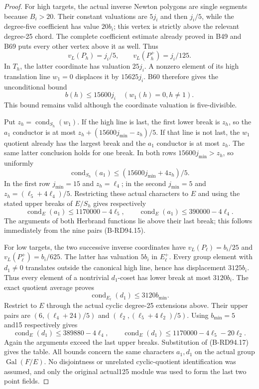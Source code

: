 \begin{proof}
For high targets, the actual inverse Newton polygons are single
segments because $B_i>20$. Their constant valuations are $5j_i$
and then $j_i/5$, while the degree-five coefficient has value
$20b_i$; this vertex is strictly above the relevant degree-25
chord. The complete coefficient estimate already proved in B49
and B69 puts every other vertex above it as well. Thus
\[
             v_L(P_h)=j_i/5,\qquad v_L(P_h^+)=j_i/125.
                                                        \tag{B-RD94.21}
\]
In $T_h$, the latter coordinate has valuation $25j_i$.
A nonzero element of its high translation line $w_1=0$ displaces
it by $15625j_i$. B60 therefore gives the unconditional bound
\[
                b(h)\le15600j_i\quad(w_1(h)=0,h\ne1).
                                                        \tag{B-RD94.22}
\]
This bound remains valid although the coordinate valuation is
five-divisible.

Put $z_h=\operatorname{cond}_{S_h}(w_1)$. If the high line is
last, the first lower break is $z_h$, so the $a_1$ conductor is
at most $z_h+(15600j_{\min}-z_h)/5$. If that line is not last,
the $w_1$ quotient already has the largest break and the $a_1$
conductor is at most $z_h$. The same latter conclusion holds
for one break. In both rows $15600j_{\min}>z_h$, so uniformly
\[
 \operatorname{cond}_{S_h}(a_1)
       \le(15600j_{\min}+4z_h)/5.                    \tag{B-RD94.23}
\]
In the first row $j_{\min}=15$ and $z_h=\ell_4$; in the second
$j_{\min}=5$ and $z_h=(\ell_5+4\ell_4)/5$. Restricting these
actual characters to $E$ and using the stated upper breaks of
$E/S_h$ gives respectively
\[
 \operatorname{cond}_E(a_1)\le1170000-4\ell_5,
 \qquad
 \operatorname{cond}_E(a_1)\le390000-4\ell_4.        \tag{B-RD94.24}
\]
The arguments of both Herbrand functions lie above their last
break; this follows immediately from the nine pairs (B-RD94.15).

For low targets, the two successive inverse coordinates have
$v_L(P_\ell)=b_i/25$ and $v_L(P_\ell^+)=b_i/625$.
The latter has valuation $5b_i$ in $E_\ell^+$. Every group element
with $d_1\ne0$ translates outside the canonical high line, hence
has displacement $3125b_i$. Thus every element of a nontrivial
$d_1$-coset has lower break at most $3120b_i$. The exact quotient
average proves
\[
               \operatorname{cond}_{E_\ell}(d_1)
                         \le3120b_{\min}.            \tag{B-RD94.25}
\]
Restrict to $E$ through the actual cyclic degree-25 extensions
above. Their upper pairs are
$(6,(\ell_4+24)/5)$ and
$(\ell_2,(\ell_5+4\ell_2)/5)$.
Using $b_{\min}=5$ and15 respectively gives
\[
 \operatorname{cond}_E(d_1)\le389880-4\ell_4,
 \qquad
 \operatorname{cond}_E(d_1)\le1170000-4\ell_5-20\ell_2.
                                                        \tag{B-RD94.26}
\]
Again the arguments exceed the last upper breaks. Substitution
of (B-RD94.17) gives the table. All bounds concern the same
characters $a_1,d_1$ on the actual group $\operatorname{Gal}(F/E)$.
No disjointness or unrelated cyclic-quotient identification was
assumed, and only the original actual125 module was used to form
the last two point fields.
\end{proof}

